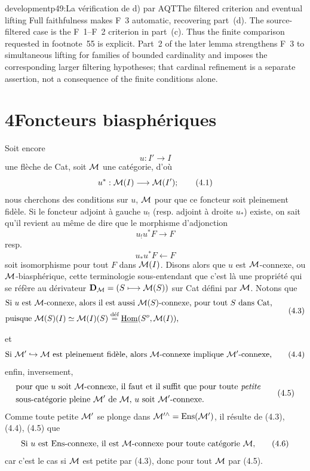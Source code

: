 \begin{dcomment}{development}{p49:La vérification de d) par AQT}{The filtered criterion and eventual lifting}
Full faithfulness makes F~3 automatic, recovering part~(d). The source-filtered case is the F~1--F~2 criterion in part~(c). Thus the finite comparison requested in footnote~55 is explicit. Part~2 of the later lemma strengthens F~3 to simultaneous lifting for families of bounded cardinality and imposes the corresponding larger filtering hypotheses; that cardinal refinement is a separate assertion, not a consequence of the finite conditions alone.
\end{dcomment}


\section*{4\quad Foncteurs biasphériques}

Soit encore
\[
u : I' \longrightarrow I
\]
une flèche de Cat, soit $\cM$ une catégorie, d'où
\[
u^* : \cM(I) \longrightarrow \cM(I');
\tag*{(4.1)}
\]
nous cherchons des conditions sur $u$, $\cM$ pour que ce foncteur soit pleinement fidèle. Si le foncteur adjoint à gauche $u_!$ (resp. adjoint à droite $u_*$) existe, on sait qu'il revient au même de dire que le morphisme d'adjonction
\[
u_!u^*F \longrightarrow F
\tag*{(4.2)}
\]
resp.
\[
u_*u^*F \longleftarrow F
\tag*{(4.2 bis)}
\]
soit isomorphisme pour tout $F$ dans $\cM(I)$. Disons alors que $u$ est $\cM$-connexe, ou $\cM$-biasphérique, cette terminologie sous-entendant que c'est là une propriété qui se réfère au dérivateur $\mathbf{D}_{\cM} = (S \longmapsto \cM(S))$ sur Cat défini par $\cM$. Notons que
\[
\begin{aligned}
&\text{Si $u$ est $\cM$-connexe, alors il est aussi $\cM(S)$-connexe, pour tout $S$ dans Cat,}\\
&\text{puisque $\cM(S)(I) \simeq \cM(I)(S) \defeq \uHom(S^o, \cM(I))$,}
\end{aligned}
\tag*{(4.3)}
\]

et
\[
\text{Si $\cM' \hookrightarrow \cM$ est pleinement fidèle, alors $\cM$-connexe implique $\cM'$-connexe,}
\tag*{(4.4)}
\]
enfin, inversement,
\[
\begin{aligned}
&\text{pour que $u$ soit $\cM$-connexe, il faut et il suffit que pour toute \textit{petite}}\\
&\text{sous-catégorie pleine $\cM'$ de $\cM$, $u$ soit $\cM'$-connexe.}
\end{aligned}
\tag*{(4.5)}
\]
Comme toute petite $\cM'$ se plonge dans $\cM'^\wedge = \operatorname{Ens}(\cM')$, il résulte de (4.3), (4.4), (4.5) que
\[
\text{Si $u$ est Ens-connexe, il est $\cM$-connexe pour toute catégorie $\cM$,}
\tag*{(4.6)}
\]
car c'est le cas si $\cM$ est petite par (4.3), donc pour tout $\cM$ par (4.5).

